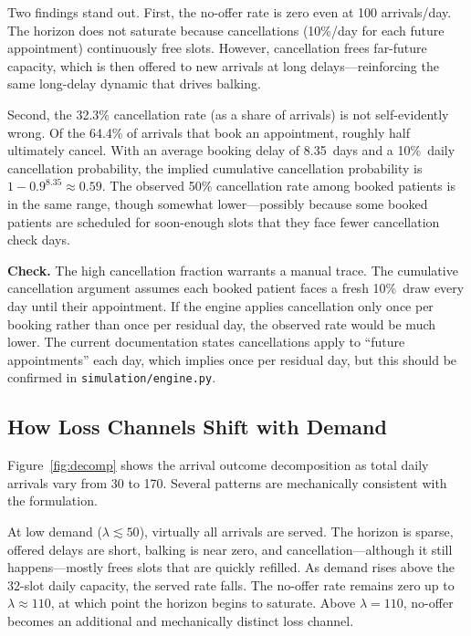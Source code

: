 \documentclass[11pt]{article}
\begin{document}
Two findings stand out. First, the no-offer rate is zero even at 100
arrivals/day. The horizon does not saturate because cancellations
(10\%/day for each future appointment) continuously free slots. However,
cancellation frees far-future capacity, which is then offered to new
arrivals at long delays---reinforcing the same long-delay dynamic that
drives balking.

Second, the 32.3\% cancellation rate (as a share of arrivals) is not
self-evidently wrong. Of the 64.4\% of arrivals that book an appointment,
roughly half ultimately cancel. With an average booking delay of 8.35~days
and a 10\%~daily cancellation probability, the implied cumulative
cancellation probability is $1 - 0.9^{8.35} \approx 0.59$. The observed
50\% cancellation rate among booked patients is in the same range, though
somewhat lower---possibly because some booked patients are scheduled for
soon-enough slots that they face fewer cancellation check days.

\begin{checkenv}
\textbf{Check.} The high cancellation fraction warrants a manual trace.
The cumulative cancellation argument assumes each booked patient faces
a fresh 10\%~draw every day until their appointment. If the engine applies
cancellation only once per booking rather than once per residual day, the
observed rate would be much lower. The current documentation states
cancellations apply to ``future appointments'' each day, which implies
once per residual day, but this should be confirmed in
\texttt{simulation/engine.py}.
\end{checkenv}

\subsection{How Loss Channels Shift with Demand}

Figure~\ref{fig:decomp} shows the arrival outcome decomposition as total
daily arrivals vary from 30 to 170. Several patterns are mechanically
consistent with the formulation.

At low demand ($\lambda \lesssim 50$), virtually all arrivals are served.
The horizon is sparse, offered delays are short, balking is near zero,
and cancellation---although it still happens---mostly frees slots that
are quickly refilled. As demand rises above the 32-slot daily capacity,
the served rate falls. The no-offer rate remains zero up to $\lambda
\approx 110$, at which point the horizon begins to saturate. Above
$\lambda = 110$, no-offer becomes an additional and mechanically distinct
loss channel.
\end{document}
